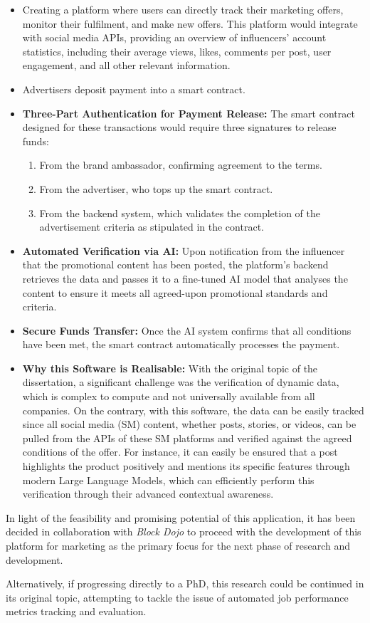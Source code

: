 \begin{itemize}
    \item Creating a platform where users can directly track their marketing offers, monitor their fulfilment, and make new offers. This platform would integrate with social media APIs, providing an overview of influencers' account statistics, including their average views, likes, comments per post, user engagement, and all other relevant information.
    \item Advertisers deposit payment into a smart contract.
    \item \textbf{Three-Part Authentication for Payment Release:} The smart contract designed for these transactions would require three signatures to release funds:
    \begin{enumerate}
        \item From the brand ambassador, confirming agreement to the terms.
        \item From the advertiser, who tops up the smart contract.
        \item From the backend system, which validates the completion of the advertisement criteria as stipulated in the contract.
    \end{enumerate}
    \item \textbf{Automated Verification via AI:} Upon notification from the influencer that the promotional content has been posted, the platform's backend retrieves the data and passes it to a fine-tuned AI model that analyses the content to ensure it meets all agreed-upon promotional standards and criteria. 
    \item \textbf{Secure Funds Transfer:} Once the AI system confirms that all conditions have been met, the smart contract automatically processes the payment.
    \item \textbf{Why this Software is Realisable:} With the original topic of the dissertation, a significant challenge was the verification of dynamic data, which is complex to compute and not universally available from all companies. On the contrary, with this software, the data can be easily tracked since all social media (SM) content, whether posts, stories, or videos, can be pulled from the APIs of these SM platforms and verified against the agreed conditions of the offer. For instance, it can easily be ensured that a post highlights the product positively and mentions its specific features through modern Large Language Models, which can efficiently perform this verification through their advanced contextual awareness.
\end{itemize}

In light of the feasibility and promising potential of this application, it has been decided in collaboration with \textit{Block Dojo} to proceed with the development of this platform for marketing as the primary focus for the next phase of research and development.

Alternatively, if progressing directly to a PhD, this research could be continued in its original topic, attempting to tackle the issue of automated job performance metrics tracking and evaluation.